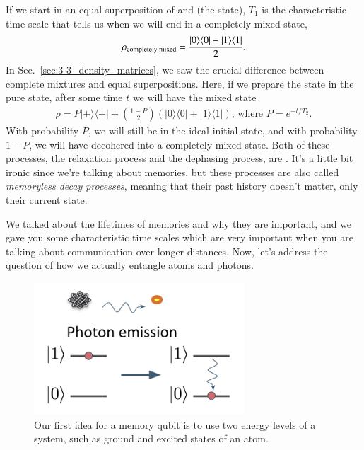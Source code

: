 If we start in an equal superposition of  and  (the \ket{+} state), $T_1$ is the characteristic time scale that tells us when we will end in a completely mixed state,
\begin{equation}
\begin{aligned}
\rho_{\textrm{completely mixed}} =\frac{|0 \rangle \langle 0|+|1 \rangle \langle 1|}{2}.
\end{aligned}
\end{equation}
In Sec.~\ref{sec:3-3_density_matrices}, we saw the crucial difference between complete mixtures and equal superpositions. Here, if we prepare the state in the pure state, after some time $t$ we will have the mixed state
\begin{equation}
\begin{aligned}
\rho=P|+\rangle\langle+|+\left(\frac{1-P}{2}\right)(|0\rangle\langle 0|+| 1\rangle\langle 1|)\text{, where }  P=e^{-t / T_2}.
\end{aligned}
\end{equation}
With probability $P$, we will still be in the ideal initial state, and with probability $1-P$, we will have decohered into a completely mixed state. Both of these processes, the relaxation process and the dephasing process, are . It's a little bit ironic since we're talking about memories, but these processes are also called \emph{memoryless decay processes}, meaning that their past history doesn't matter, only their current state.

We talked about the lifetimes of memories and why they are important, and we gave you some characteristic time scales which are very important when you are talking about communication over longer distances. Now, let's address the question of how we actually entangle atoms and photons.

\begin{figure}[t]
    \centering
    \includegraphics[width=0.7\textwidth]{lesson13/memory-first-idea.png}
    \caption[First idea for memory]{Our first idea for a memory qubit is to use two energy levels of a system, such as ground and excited states of an atom.}
    \label{fig:13-memory-first}
\end{figure}

